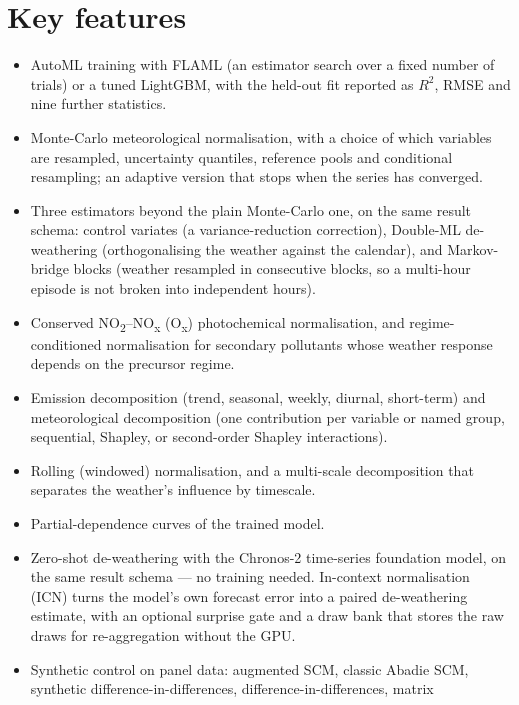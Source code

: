 \documentclass[11pt]{report}
\newcommand{\nosep}{\setlength{\itemsep}{0pt}\setlength{\parskip}{0pt}\setlength{\topsep}{2pt}}
\newcommand{\NOtwo}{NO\textsubscript{2}}
\begin{document}
\section{Key features}
\begin{itemize}\nosep
  \item AutoML training with FLAML (an estimator search over a fixed number of trials) or a
        tuned LightGBM, with the held-out fit reported as $R^2$, RMSE and nine
        further statistics.
  \item Monte-Carlo meteorological normalisation, with a choice of which variables
        are resampled, uncertainty quantiles, reference pools and conditional
        resampling; an adaptive version that stops when the series has converged.
  \item Three estimators beyond the plain Monte-Carlo one, on the same result
        schema: control variates (a variance-reduction correction), Double-ML
        de-weathering (orthogonalising the weather against the calendar), and
        Markov-bridge blocks (weather resampled in consecutive blocks, so a
        multi-hour episode is not broken into independent hours).
  \item Conserved \NOtwo{}--NO\textsubscript{x} (O\textsubscript{x}) photochemical
        normalisation, and regime-conditioned normalisation for secondary pollutants
        whose weather response depends on the precursor regime.
  \item Emission decomposition (trend, seasonal, weekly, diurnal, short-term) and
        meteorological decomposition (one contribution per variable or named group,
        sequential, Shapley, or second-order Shapley interactions).
  \item Rolling (windowed) normalisation, and a multi-scale decomposition that
        separates the weather's influence by timescale.
  \item Partial-dependence curves of the trained model.
  \item Zero-shot de-weathering with the Chronos-2 time-series foundation model, on
        the same result schema --- no training needed. In-context normalisation
        (ICN) turns the model's own forecast error into a paired de-weathering
        estimate, with an optional surprise gate and a draw bank that stores the raw
        draws for re-aggregation without the GPU.
  \item Synthetic control on panel data: augmented SCM, classic Abadie SCM,
        synthetic difference-in-differences, difference-in-differences, matrix

\end{itemize}
\end{document}
